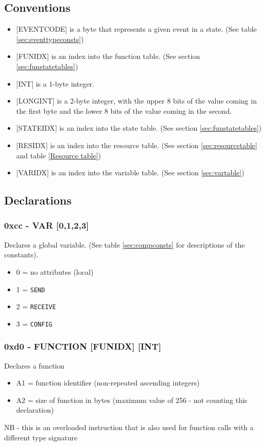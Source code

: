 \documentclass[12pt,a4paper]{scrbook}
\begin{document}
\subsection{Conventions}
\begin{itemize}
\item $[$EVENTCODE$]$ is a byte that represents a given event in a state. (See 
		table \ref{sec:eventtypeconsts})
\item $[$FUNIDX$]$ is an index into the function table. (See section \ref{sec:funstatetables})
\item $[$INT$]$ is a 1-byte integer.  
\item $[$LONGINT$]$ is a 2-byte integer, with the upper 8 bits of the value coming in the first byte 
		and the lower 8 bits of the value coming in the second.
\item $[$STATEIDX$]$ is an index into the state table. (See section \ref{sec:funstatetables})
\item $[$RESIDX$]$ is an index into the resource table. (See section \ref{sec:resourcetable} and 
		table \ref{Resource table})
\item $[$VARIDX$]$ is an index into the variable table. (See section \ref{sec:vartable})
\end{itemize}



\subsection{Declarations}

\subsubsection{0xcc - VAR [0,1,2,3]} 
Declares a global variable.  (See table \ref{sec:compconsts} for descriptions of the constants).
\begin{itemize}
\item 0 = no attributes (local)
\item 1 = \texttt{SEND}
\item 2 = \texttt{RECEIVE}
\item 3 = \texttt{CONFIG}
\end{itemize}

\subsubsection{0xd0 - FUNCTION [FUNIDX] [INT]}
Declares a function
\begin{itemize}
\item A1 = function identifier (non-repeated ascending integers)
\item A2 = size of function in bytes (maximum value of 256 - not counting this declaration)
\end{itemize}
NB - this is an overloaded instruction that is also used for function calls with a different type
signature
\end{document}
